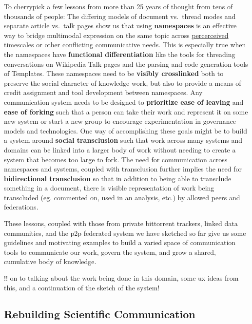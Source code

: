 \documentclass[10pt]{tufte-book}
\begin{document}
To cherrypick a few lessons from more than 25 years of thought from tens
of thousands of people: The differing models of document vs.~thread
modes and separate article vs.~talk pages show us that using
\textbf{namespaces} is an effective way to bridge multimodal expression
on the same topic across
\href{https://communitywiki.org/wiki/TimeInWikis}{percerceived
timescales} or other conflicting communicative needs. This is especially
true when the namespaces have \textbf{functional differentiation} like
the tools for threading conversations on Wikipedia Talk pages and the
parsing and code generation tools of Templates. These namespaces need to
be \textbf{visibly crosslinked} both to preserve the social character of
knowledge work, but also to provide a means of credit assignment and
tool development between namespaces. Any communication system needs to
be designed to \textbf{prioritize ease of leaving} and \textbf{ease of
forking} such that a person can take their work and represent it on some
new system or start a new group to encourage experimentation in
governance models and technologies. One way of accomplishing these goals
might be to build a system around \textbf{social transclusion} such that
work across many systems and domains can be linked into a larger body of
work without needing to create a system that becomes too large to fork.
The need for communication across namespaces and systems, coupled with
transclusion further implies the need for \textbf{bidirectional
transclusion} so that in addition to being able to transclude something
in a document, there is visible representation of work being transcluded
(eg. commented on, used in an analysis, etc.) by allowed peers and
federations.

These lessons, coupled with those from private bittorrent trackers,
linked data communities, and the p2p federated system we have sketched
so far give us some guidelines and motivating examples to build a varied
space of communication tools to communicate our work, govern the system,
and grow a shared, cumulative body of knowledge.

!! on to talking about the work being done in this domain, some ux ideas
from this, and a continuation of the sketch of the system!






\subsection{Rebuilding Scientific
Communication}
\end{document}
